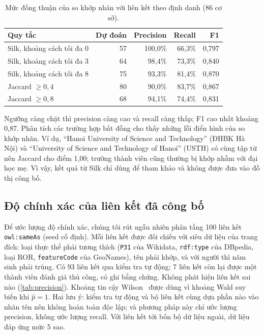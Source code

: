 \documentclass[12pt,a4paper]{article}
\begin{document}
\begin{table}[htbp]
\centering\small
\caption{Mức đồng thuận của so khớp nhãn với liên kết theo định danh (86 cơ sở).}\label{tab:silk}
\begin{tabular}{lrrrr}
\toprule
Quy tắc & Dự đoán & Precision & Recall & F1 \\
\midrule
Silk, khoảng cách tối đa 0 & 57 & 100,0\% & 66,3\% & 0,797 \\
Silk, khoảng cách tối đa 3 & 64 & 98,4\% & 73,3\% & 0,840 \\
Silk, khoảng cách tối đa 8 & 75 & 93,3\% & 81,4\% & 0,870 \\
Jaccard \(\geq 0{,}4\) & 80 & 90,0\% & 83,7\% & 0,867 \\
Jaccard \(\geq 0{,}8\) & 68 & 94,1\% & 74,4\% & 0,831 \\
\bottomrule
\end{tabular}
\end{table}

Ngưỡng càng chặt thì precision càng cao và recall càng thấp; F1 cao nhất khoảng 0,87. Phân tích các trường hợp bất đồng
cho thấy những lỗi điển hình của so khớp nhãn. Ví dụ, ``Hanoi University of Science and Technology'' (ĐHBK Hà Nội) và
``University of Science and Technology of Hanoi'' (USTH) có cùng tập từ nên Jaccard cho điểm 1,00; trường thành viên cũng
thường bị khớp nhầm với đại học mẹ. Vì vậy, kết quả từ Silk chỉ dùng để tham khảo và không được đưa vào đồ thị công bố.

\subsection{Độ chính xác của liên kết đã công bố}
Để ước lượng độ chính xác, chúng tôi rút ngẫu nhiên phân tầng 100 liên kết \texttt{owl:sameAs} (seed cố định). Mỗi liên
kết được đối chiếu với siêu dữ liệu của trang đích: loại thực thể phải tương thích (\texttt{P31} của Wikidata,
\texttt{rdf:type} của DBpedia, loại ROR, \texttt{featureCode} của GeoNames), tên phải khớp, và với người thì năm sinh phải
trùng. Có 93 liên kết qua kiểm tra tự động; 7 liên kết còn lại được một thành viên đánh giá thủ công, có ghi bằng chứng.
Không phát hiện liên kết sai nào (\cref{tab:precision}). Khoảng tin cậy Wilson~\cite{wilson1927} được dùng vì khoảng Wald
suy biến khi \(\hat p = 1\). Hai lưu ý: kiểm tra tự động và bộ liên kết cùng dựa phần nào vào nhãn tên nên không hoàn toàn
độc lập; và phương pháp này chỉ ước lượng precision, không ước lượng recall. Với liên kết tới bốn bộ dữ liệu ngoài, dữ liệu
đáp ứng mức 5 sao.
\end{document}
